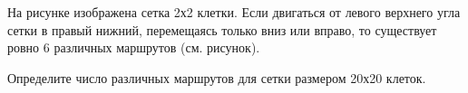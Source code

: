 
На рисунке изображена сетка 2х2 клетки. Если двигаться от левого верхнего угла сетки в правый нижний, перемещаясь только вниз или вправо, то существует ровно 6 различных маршрутов (см. рисунок). 

Определите число различных маршрутов для сетки размером 20х20 клеток. 

